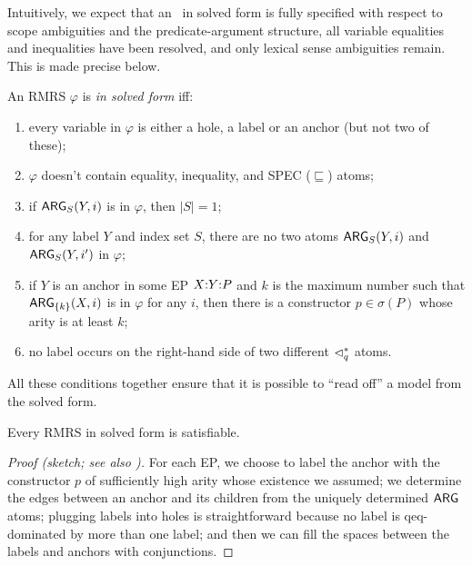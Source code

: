 Intuitively, we expect that an \rmrs\ in solved form is fully
specified with respect to scope ambiguities and the predicate-argument
structure, all variable equalities and inequalities have been
resolved, and only lexical sense ambiguities remain.  This is made
precise below.


\begin{definition}\label{defn:solved-forms}
  An RMRS $\varphi$ is \emph{in solved form} iff:
  \begin{enumerate}
  \item every variable in $\varphi$ is either a hole, a label or an
    anchor (but not two of these);
  \item $\varphi$ doesn't contain equality, inequality, and SPEC
    ($\sqsubseteq$) atoms;
  \item if $\mathsf{ARG}_S(Y,i)$ is in $\varphi$, then $|S| = 1$;
  \item for any label $Y$ and index set $S$, there
    are no two atoms $\mathsf{ARG}_S(Y,i)$ and $\mathsf{ARG}_S(Y,i')$ in $\varphi$;
  \item if $Y$ is an anchor in some EP $X {:} Y {:} P$ and $k$ is the
    maximum number such that $\mathsf{ARG}_{\{k\}}(X,i)$ is in $\varphi$ for
    any $i$, then there is a constructor $p \in \sigma(P)$ whose arity
    is at least $k$;
  \item no label occurs on the right-hand side of two
    different $\lhd^*_q$ atoms.
  \end{enumerate}
\end{definition}


All these conditions together ensure that it is possible to ``read
off'' a model from the solved form.


\begin{prop} \label{prop:solved-forms-are-satisfiable}
  Every RMRS in solved form is satisfiable.
\end{prop}
\begin{proof}[Proof (sketch; see also
  \cite{Duchier00dominanceconstraints})] 
  For each EP, we choose to label the anchor with the constructor $p$
  of sufficiently high arity whose existence we assumed; we determine
  the edges between an anchor and its children from the uniquely
  determined $\mathsf{ARG}$ atoms; plugging labels into holes is
  straightforward because no label is qeq-dominated by more than one
  label; and then we can fill the spaces between the labels and
  anchors with conjunctions.
\end{proof}



